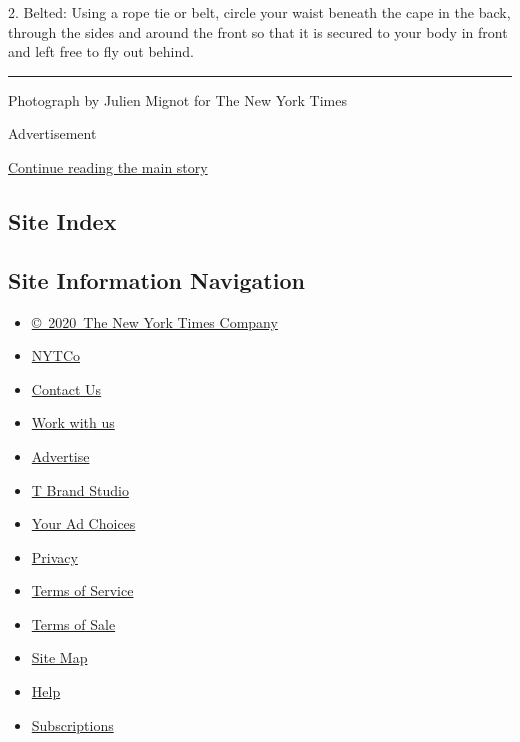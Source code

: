 2. Belted: Using a rope tie or belt, circle your waist beneath the cape
in the back, through the sides and around the front so that it is
secured to your body in front and left free to fly out behind.

\begin{center}\rule{0.5\linewidth}{\linethickness}\end{center}

Photograph by Julien Mignot for The New York Times

Advertisement

\protect\hyperlink{after-bottom}{Continue reading the main story}

\hypertarget{site-index}{%
\subsection{Site Index}\label{site-index}}

\hypertarget{site-information-navigation}{%
\subsection{Site Information
Navigation}\label{site-information-navigation}}

\begin{itemize}
\tightlist
\item
  \href{https://help.nytimes3xbfgragh.onion/hc/en-us/articles/115014792127-Copyright-notice}{©~2020~The
  New York Times Company}
\end{itemize}

\begin{itemize}
\tightlist
\item
  \href{https://www.nytco.com/}{NYTCo}
\item
  \href{https://help.nytimes3xbfgragh.onion/hc/en-us/articles/115015385887-Contact-Us}{Contact
  Us}
\item
  \href{https://www.nytco.com/careers/}{Work with us}
\item
  \href{https://nytmediakit.com/}{Advertise}
\item
  \href{http://www.tbrandstudio.com/}{T Brand Studio}
\item
  \href{https://www.nytimes3xbfgragh.onion/privacy/cookie-policy\#how-do-i-manage-trackers}{Your
  Ad Choices}
\item
  \href{https://www.nytimes3xbfgragh.onion/privacy}{Privacy}
\item
  \href{https://help.nytimes3xbfgragh.onion/hc/en-us/articles/115014893428-Terms-of-service}{Terms
  of Service}
\item
  \href{https://help.nytimes3xbfgragh.onion/hc/en-us/articles/115014893968-Terms-of-sale}{Terms
  of Sale}
\item
  \href{https://spiderbites.nytimes3xbfgragh.onion}{Site Map}
\item
  \href{https://help.nytimes3xbfgragh.onion/hc/en-us}{Help}
\item
  \href{https://www.nytimes3xbfgragh.onion/subscription?campaignId=37WXW}{Subscriptions}
\end{itemize}
